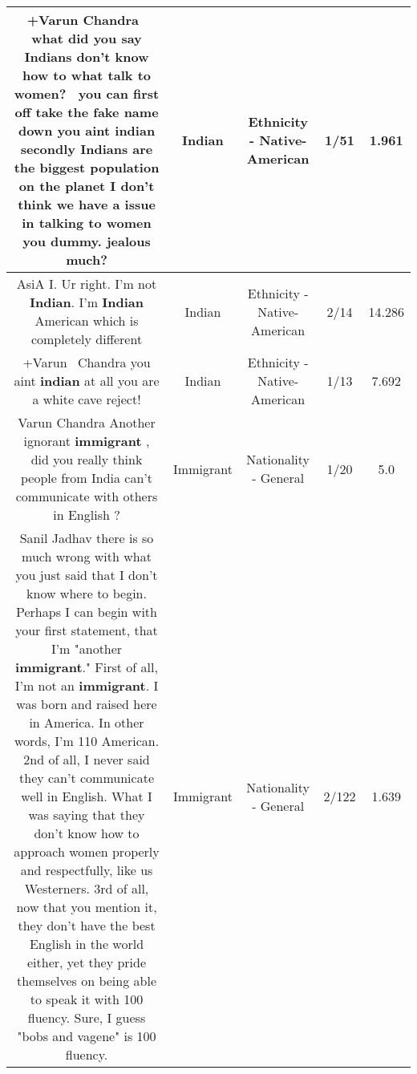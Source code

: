 \documentclass[11pt]{article}
\newlength\mylength
\begin{document}
\begin{center}
\begin{longtable}{|C{.65\mylength}|C{.30\mylength}|C{.12\mylength}|C{.12\mylength}|C{.12\mylength}|}
  \small +Varun Chandra  what did you say Indians don't know how to what talk to women?  you can first off take the fake name down you aint \textbf{indian} secondly Indians are the biggest population on the planet I don't think we have a issue in talking to women you dummy. jealous much?\normalsize   & Indian & Ethnicity - Native-American & 1/51 & 1.961 \\  \hline
  \small AsiA I. Ur right. I'm not \textbf{Indian}. I'm \textbf{Indian} American which is completely different\normalsize   & Indian & Ethnicity - Native-American & 2/14 & 14.286 \\  \hline
  \small +Varun  Chandra you aint \textbf{indian} at all you are a white cave reject!\normalsize   & Indian & Ethnicity - Native-American & 1/13 & 7.692 \\  \hline
  \small Varun Chandra Another ignorant \textbf{immigrant} , did you really think people from India can't communicate with others in English ?\normalsize   & Immigrant & Nationality - General & 1/20 & 5.0 \\  \hline
  \small Sanil Jadhav there is so much wrong with what you just said that I don't know where to begin. Perhaps I can begin with your first statement, that I'm "another \textbf{immigrant}." First of all, I'm not an \textbf{immigrant}. I was born and raised here in America. In other words, I'm 110 American. 2nd of all, I never said they can't communicate well in English. What I was saying that they don't know how to approach women properly and respectfully, like us Westerners. 3rd of all, now that you mention it, they don't have the best English in the world either, yet they pride themselves on being able to speak it with 100 fluency. Sure, I guess "bobs and vagene" is 100 fluency.\normalsize   & Immigrant & Nationality - General & 2/122 & 1.639 \\  \hline

\end{longtable}
\end{center}
\end{document}
